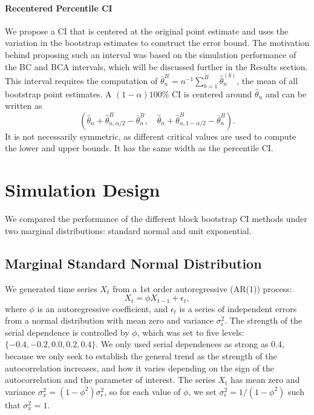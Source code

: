 \documentclass[10pt]{article}
\begin{document}
\paragraph{Recentered Percentile CI}
We propose a CI that is centered at the original point estimate and uses the 
variation in the bootstrap estimates to construct the error bound. 
The motivation behind proposing such an interval was based on the 
simulation performance of the BC and BCA intervals, which will be discussed
further in the Results section. 
This interval 
requires
the computation of $\bar\theta_n^B = n^{-1}\sum_{b=1}^B \hat\theta_n^{(b)}$, the 
mean of all bootstrap point estimates. A $(1 - \alpha)100\%$ CI is
centered around $\hat\theta_n$ and can be written as 
\[
(\hat\theta_n + \hat\theta_{n, \alpha/2}^{B} - \bar\theta_n^{B}, \quad
\hat\theta_n + \hat\theta_{n, 1 - \alpha/2}^{B} - \bar\theta_n^{B}).
\]
It is not necessarily symmetric, as different critical values are used to 
compute the lower and upper bounds. It has the same width as the percentile CI.


\section*{Simulation Design}
\label{sec:simdes}



We compared the performance of the different block bootstrap CI methods 
under two marginal distributions: standard normal and unit exponential.


\subsection*{Marginal Standard Normal Distribution}

We generated time series $X_t$ from a 1st 
order autoregressive (AR(1)) process:
\begin{equation*}
X_t = \phi X_{t-1} + \epsilon_t,
\end{equation*}
where $\phi$ is an autoregressive coefficient, and $\epsilon_t$ is a series of
independent errors from a normal distribution with mean zero and variance
$\sigma_{\epsilon}^2$. The strength of the serial dependence is controlled by
$\phi$, which was set to five levels: $\{-0.4, -0.2, \allowbreak 0.0, 0.2, 0.4\}$. 
We only
used serial dependences as strong as 0.4, because we only seek to 
establish the 
general trend as the strength of the autocorrelation 
increases, and how it varies depending on the sign of the autocorrelation and 
the parameter of interest. The 
series $X_t$ has mean zero and variance 
$\sigma_x^2 = (1 - \phi^2) \sigma_{\epsilon}^2$, so for each value of $\phi$, we 
set $\sigma_{\epsilon}^2 = 1 / (1 - \phi^2)$ such that $\sigma_x^2 = 1$.
\end{document}
